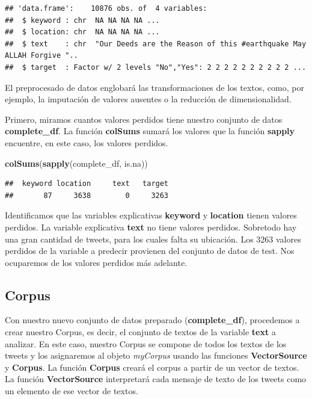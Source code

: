 \documentclass[]{article}
\newenvironment{Shaded}{\begin{snugshade}}{\end{snugshade}}
\newcommand{\KeywordTok}[1]{\textcolor[rgb]{0.13,0.29,0.53}{\textbf{#1}}}
\newcommand{\NormalTok}[1]{#1}
\begin{document}
\begin{verbatim}
## 'data.frame':    10876 obs. of  4 variables:
##  $ keyword : chr  NA NA NA NA ...
##  $ location: chr  NA NA NA NA ...
##  $ text    : chr  "Our Deeds are the Reason of this #earthquake May ALLAH Forgive "..
##  $ target  : Factor w/ 2 levels "No","Yes": 2 2 2 2 2 2 2 2 2 2 ...
\end{verbatim}

El preprocesado de datos englobará las transformaciones de los textos,
como, por ejemplo, la imputación de valores ausentes o la reducción de
dimensionalidad.

Primero, miramos cuantos valores perdidos tiene nuestro conjunto de
datos \textbf{complete\_df}. La función \textbf{colSums} sumará los
valores que la función \textbf{sapply} encuentre, en este caso, los
valores perdidos.

\begin{Shaded}
\begin{Highlighting}[]
\KeywordTok{colSums}\NormalTok{(}\KeywordTok{sapply}\NormalTok{(complete_df, is.na))}
\end{Highlighting}
\end{Shaded}

\begin{verbatim}
##  keyword location     text   target 
##       87     3638        0     3263
\end{verbatim}

Identificamos que las variables explicativas \textbf{keyword} y
\textbf{location} tienen valores perdidos. La variable explicativa
\textbf{text} no tiene valores perdidos. Sobretodo hay una gran cantidad
de tweets, para los cuales falta su ubicación. Los 3263 valores perdidos
de la variable a predecir provienen del conjunto de datos de test. Nos
ocuparemos de los valores perdidos más adelante.

\hypertarget{corpus}{%
\subsection{Corpus}\label{corpus}}

Con nuestro nuevo conjunto de datos preparado (\textbf{complete\_df}),
procedemos a crear nuestro Corpus, es decir, el conjunto de textos de la
variable \textbf{text} a analizar. En este caso, nuestro Corpus se
compone de todos los textos de los tweets y los asignaremos al objeto
\emph{myCorpus} usando las funciones \textbf{VectorSource} y
\textbf{Corpus}. La función \textbf{Corpus} creará el corpus a partir de
un vector de textos. La función \textbf{VectorSource} interpretará cada
mensaje de texto de los tweets como un elemento de ese vector de textos.
\end{document}
